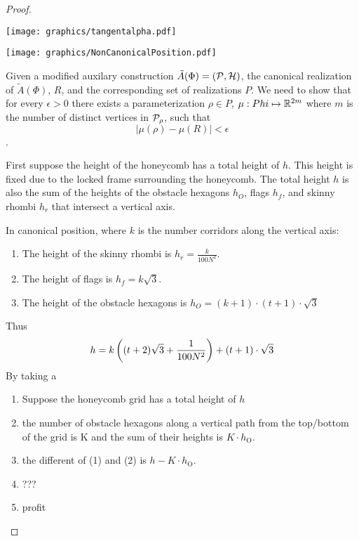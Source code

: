 \begin{proof}
\begin{minipage}{\linewidth}
\begin{center}
\texttt{[image: graphics/tangentalpha.pdf]}
\end{center}
\end{minipage}
\begin{minipage}{\linewidth}
\begin{center}
\texttt{[image: graphics/NonCanonicalPosition.pdf]}
\end{center}
\end{minipage}


Given a modified auxilary construction $\tilde{A}(\Phi) = \left({\cal P},{\cal H}\right)$, the canonical realization of $\tilde{A}(\Phi)$, $R$, and the corresponding set of realizations $P$. 
We need to show that for every $\epsilon > 0$ there exists a parameterization $\rho \in P$, $\mu:Phi \mapsto {\mathbb{R}}^{2m}$ where $m$ is the number of distinct vertices in ${\cal P}_\rho$, such that $$\left\vert \mu (\rho) - \mu (R) \right\vert < \epsilon$$.

First suppose the height of the honeycomb has a total height of $h$.
This height is fixed due to the locked frame surrounding the honeycomb. 
The total height $h$ is also the sum of the heights of the obstacle hexagons $h_O$, flags $h_f$, and skinny rhombi $h_r$ that intersect a vertical axis. 

In canonical position, where $k$ is the number corridors along the vertical axis:
\begin{enumerate}
\item The height of the skinny rhombi is $h_r = \frac{k}{100 N^2}$. 
\item The height of flags is $h_f = k \sqrt{3}$.
\item The height of the obstacle hexagons is $h_O = (k+1) \cdot (t+1) \cdot \sqrt{3}$
\end{enumerate}
Thus $$h = k \left( (t+2) \sqrt{3} + \frac{1}{100 N^2} \right) + (t+1) \cdot \sqrt{3}$$
By taking a 
\begin{enumerate}
\item Suppose the honeycomb grid has a total height of $h$
\item the number of obstacle hexagons along a vertical path from the top/bottom of the grid is K and the sum of their heights is $K \cdot h_\text{O}$.  
\item the different of (1) and (2) is $h - K \cdot h_\text{O}$.
\item ???
\item profit
\end{enumerate}





\end{proof}
